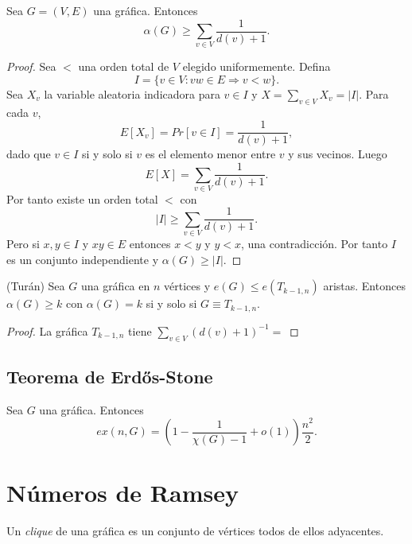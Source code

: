 \begin{theorem}
  Sea $G = (V, E)$ una gráfica. Entonces $$ \alpha(G) \geq \sum_{v
  \in V} \frac{1}{d(v) + 1}.$$
\end{theorem}

\begin{proof}
  Sea $<$ una orden total de $V$ elegido uniformemente. Defina
  $$I = \{v \in V: vw \in E \Rightarrow v < w \}.$$
  Sea $X_{v}$ la variable aleatoria indicadora para $v \in I$ y $X =
  \sum_{v \in V} X_v = \vert I \vert$. Para cada $v$,
  $$E[X_v] = Pr[v \in I] = \frac{1}{d(v) + 1},$$
  dado que $v \in I$ si y solo si $v$ es el elemento menor entre $v$
  y sus vecinos. Luego
  $$ E[X] = \sum_{v \in V} \frac{1}{d(v) + 1}. $$
  Por tanto existe un orden total $<$ con
  $$\vert I \vert \ge \sum_{v \in V} \frac{1}{d(v)  +1 }.$$
  Pero si $x, y \in I$ y $xy \in E$ entonces $x < y$ y $y < x$, una
  contradicción. Por tanto $I$ es un conjunto independiente y
  $\alpha(G) \ge \vert I \vert.$
\end{proof}

\begin{theorem} (Turán)
  Sea $G$ una gráfica en $n$ vértices y $e(G) \le e(T_{k-1, n})$
  aristas. Entonces $\alpha(G) \geq k$ con $\alpha(G) = k$ si y solo
  si $G \equiv T_{k-1, n}$.
\end{theorem}

\begin{proof} %
  La gráfica $T_{k-1, n}$ tiene $\sum_{v \in V}(d(v) + 1)^{-1} = $
\end{proof}
\subsection{Teorema de Erdős-Stone} %
\begin{theorem}
  Sea $G$ una gráfica. Entonces
  $$ex(n, G) = \left( 1 - \frac{1}{\chi(G) - 1} + o(1) \right)\frac{n^2}{2}. $$
\end{theorem}

\section{Números de Ramsey}
Un \textit{clique} de una gráfica es un conjunto de vértices todos de
ellos adyacentes.

